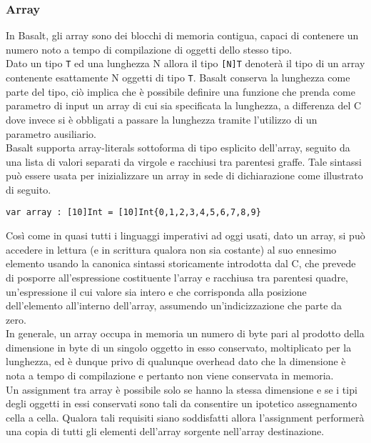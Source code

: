 \subsubsection{Array}
In Basalt, gli array sono dei blocchi di memoria contigua, capaci di contenere un numero noto a tempo di compilazione di oggetti dello stesso tipo. \\

Dato un tipo \texttt{T} ed una lunghezza N allora il tipo \texttt{[N]T} denoterà il tipo di un array contenente esattamente  N oggetti di tipo \texttt{T}. Basalt 
conserva la lunghezza come parte del tipo, ciò implica che è possibile definire una funzione che prenda come parametro di input un array di cui 
sia specificata la lunghezza, a differenza del C dove invece si è obbligati a passare la lunghezza tramite l’utilizzo di un parametro ausiliario.  \\

Basalt supporta array-literals sottoforma di tipo esplicito dell’array, seguito da una lista di valori separati 
da virgole e racchiusi tra parentesi graffe. Tale sintassi può essere usata per inizializzare un array in 
sede di dichiarazione come illustrato di seguito. \\

\vspace{0.5cm}
\begin{lstlisting}[frame=single]
var array : [10]Int = [10]Int{0,1,2,3,4,5,6,7,8,9}
\end{lstlisting}
\vspace{0.5cm}

Così come in quasi tutti i linguaggi imperativi ad oggi usati, dato un array, si può accedere in lettura (e in scrittura qualora non sia costante) 
al suo ennesimo elemento usando la canonica sintassi storicamente introdotta dal C, che prevede 
di posporre all’espressione costituente l’array e racchiusa tra parentesi quadre, un'espressione il cui valore sia intero e che 
corrisponda alla posizione dell’elemento all’interno dell’array, assumendo un’indicizzazione che parte da zero. \\

In generale, un array occupa in memoria un numero di byte pari al prodotto della dimensione 
in byte di un singolo oggetto in esso conservato, moltiplicato per la lunghezza, ed è dunque privo di qualunque overhead 
dato che la dimensione è nota a tempo di compilazione e pertanto non viene conservata in memoria. \\

Un assignment tra array è possibile solo se hanno la stessa dimensione e se i tipi 
degli oggetti in essi conservati sono tali da consentire un ipotetico assegnamento cella a cella. Qualora tali 
requisiti siano soddisfatti allora l’assignment performerà una copia di tutti gli elementi dell’array sorgente nell’array destinazione.
